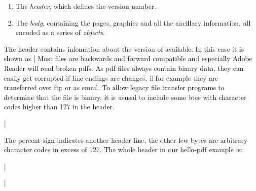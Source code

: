 \begin{enumerate}[1.]
\item The \textit{header}, which defines the \pdf version number.
\item The \textit{body}, containing the pages, graphics and all the ancillary information, all encoded as a series of \textit{objects}.
\end{enumerate}

The header contains infomation about the version of \pdf available. In this case it is shown as |%
Most files are backwards and forward compatible and especially Adobe Reader will read broken pdfs. As pdf files always contain binary data, they can easily get corrupted if line endings are changes, if for example they are transferred over ftp or as email. To allow legacy file transfer programs to determine that the file is binary, it is ususal to include some btes with character codes higher than 127 in the header.

|%

The percent sign indicates another header line, the other few bytes are arbitrary character codes in excess of 127. The whole header in our hello-pdf example is:


|%

|%



























